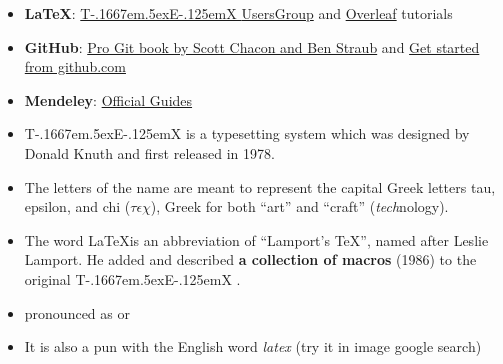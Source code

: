 \documentclass[a4paper,12pt]{article} %
\def\TeX{{\rm T\kern-.1667em\lower.5ex\hbox{E}\kern-.125emX }}
\begin{document}
\begin{center}

\begin{tcolorbox}[width=\textwidth, title={\textbf{Recommended resources}}, colbacktitle=white, coltitle=black, colback={white}]
	\begin{itemize}
	\item \textbf{LaTeX}: \href{https://tug.org/begin.html}{\TeX UsersGroup} and \href{https://www.overleaf.com/learn/latex/Learn_LaTeX_in_30_minutes}{Overleaf} tutorials
	\item \textbf{GitHub}: \href{https://git-scm.com/book/en/v2}{Pro Git book by Scott Chacon and Ben Straub} and \href{https://docs.github.com/en/get-started}{Get started from github.com}
	\item \textbf{Mendeley}: \href{https://www.mendeley.com/guides}{Official Guides}
	
\end{itemize}
	
\end{tcolorbox}%

\bigskip

\begin{tcolorbox}[width=\textwidth, title={\textbf{Historical Notes and Trivia}}, colbacktitle=yellow!20, coltitle=black, colback={yellow!20}]
	\begin{itemize}
		\item \TeX is a typesetting system which was designed by Donald Knuth and first released in 1978.
		\item The letters of the name are meant to represent the capital Greek letters tau, epsilon, and chi ($\tau\epsilon\chi$), Greek for both ``art'' and ``craft'' (\textit{tech}nology).
		\item The word \LaTeX is an abbreviation of ``Lamport's TeX'', named after Leslie Lamport. He added and described \textbf{a collection of macros} (1986) to the original \TeX.
		\item  pronounced as  or  
		\item It is also a pun with the English word \textit{latex} (try it in image google search)
	\end{itemize}
	
\end{tcolorbox}%

\end{center}
\end{document}
